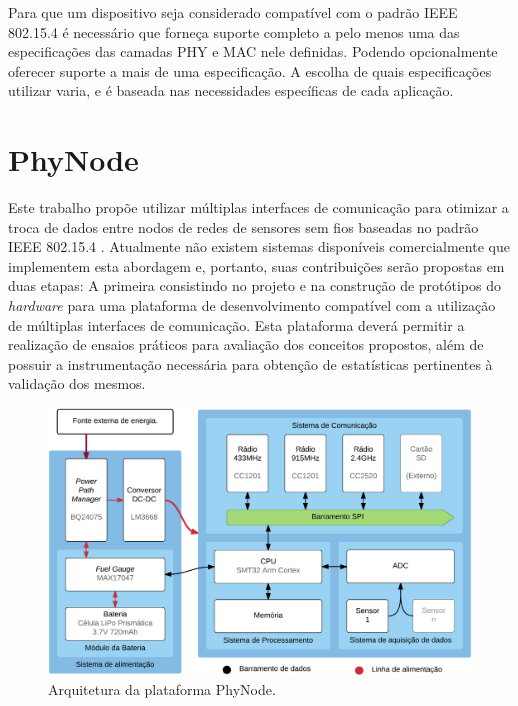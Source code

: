 \documentclass[
	12pt,				%
	openright,			%
	oneside,
	a4paper,			%
	english,			%
	french,				%
	spanish,			%
	brazil				%
	]{abntex2}
\begin{document}
Para que um dispositivo seja considerado compatível com o padrão IEEE 802.15.4 é necessário que forneça suporte completo a pelo menos uma das especificações das camadas PHY e MAC nele definidas. Podendo opcionalmente oferecer suporte a mais de uma especificação. A escolha de quais especificações utilizar varia, e é baseada nas necessidades específicas de cada aplicação.

\chapter{PhyNode} \label{phynode}

Este trabalho propõe utilizar múltiplas interfaces de comunicação para otimizar a troca de dados entre nodos de redes de sensores sem fios baseadas no padrão IEEE 802.15.4 \cite{IEEE2016}. Atualmente não existem sistemas disponíveis comercialmente que implementem esta abordagem e, portanto, suas contribuições serão propostas em duas etapas: A primeira consistindo no projeto e na construção de protótipos do \textit{hardware} para uma plataforma de desenvolvimento compatível com a utilização de múltiplas interfaces de comunicação. Esta plataforma deverá permitir a realização de ensaios práticos para avaliação dos conceitos propostos, além de possuir a instrumentação necessária para obtenção de estatísticas pertinentes à validação dos mesmos. 

\begin{figure}[htb]
	\caption{\label{fig_phynode}Arquitetura da plataforma PhyNode.}
	\begin{center}
		\includegraphics[width=\linewidth]{SensorNode_PhyNode}
	\end{center}
\end{figure}
\end{document}
